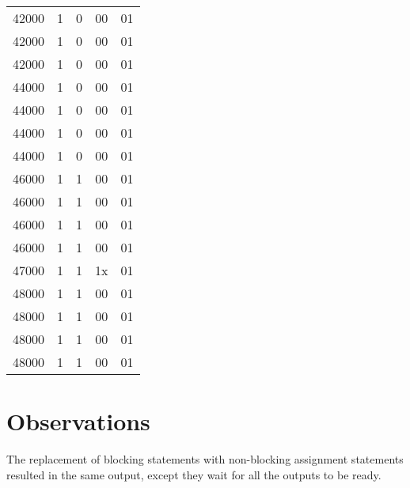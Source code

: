 \documentclass[paper=usletter, fontsize=12pt]{article}
\begin{document}
\begin{longtable*}{@{\extracolsep{\fill}} ccccc}
        42000 & 1 & 0 & 00 & 01 \\
        42000 & 1 & 0 & 00 & 01 \\
        42000 & 1 & 0 & 00 & 01 \\
        44000 & 1 & 0 & 00 & 01 \\
        44000 & 1 & 0 & 00 & 01 \\
        44000 & 1 & 0 & 00 & 01 \\
        44000 & 1 & 0 & 00 & 01 \\
        46000 & 1 & 1 & 00 & 01 \\
        46000 & 1 & 1 & 00 & 01 \\
        46000 & 1 & 1 & 00 & 01 \\
        46000 & 1 & 1 & 00 & 01 \\
        47000 & 1 & 1 & 1x & 01 \\
        48000 & 1 & 1 & 00 & 01 \\
        48000 & 1 & 1 & 00 & 01 \\
        48000 & 1 & 1 & 00 & 01 \\
        48000 & 1 & 1 & 00 & 01 \\
    \end{longtable*}

    \section{Observations}
    The replacement of blocking statements with non-blocking assignment statements resulted in the same output, except they wait for all the outputs to be ready.
\end{document}
